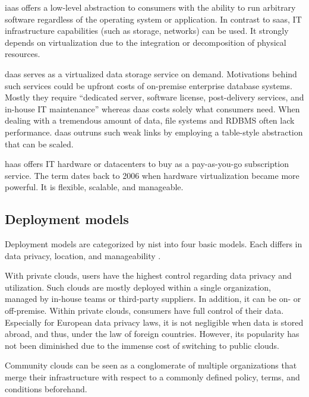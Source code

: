 \ac{iaas} offers a low-level abstraction to consumers with the ability to run arbitrary software regardless of the operating system or application.
In contrast to \ac{saas}, IT infrastructure capabilities (such as storage, networks) can be used.
It strongly depends on virtualization due to the integration or decomposition of physical resources. \cite{Mell2011}

\ac{daas} serves as a virtualized data storage service on demand.
Motivations behind such services could be upfront costs of on-premise enterprise database systems. \cite{Dillon2010}
Mostly they require \enquote{dedicated server, software license, post-delivery services, and in-house IT maintenance} \cite{Dillon2010} whereas \ac{daas} costs solely what consumers need.
When dealing with a tremendous amount of data, file systems and RDBMS often lack performance.
\ac{daas} outruns such weak links by employing a table-style abstraction that can be scaled. \cite{Dillon2010}

\ac{haas} offers IT hardware or datacenters to buy as a pay-as-you-go subscription service.
The term dates back to 2006 when hardware virtualization became more powerful.
It is flexible, scalable, and manageable. \cite{Wang2010}

\subsection{Deployment models}
\label{subsec:cloud-deployment}

Deployment models are categorized by \ac{nist} into four basic models.
Each differs in data privacy, location, and manageability \cite{Mell2011}.

With private clouds, users have the highest control regarding data privacy and utilization.
Such clouds are mostly deployed within a single organization, managed by in-house teams or third-party suppliers.
In addition, it can be on- or off-premise.
Within private clouds, consumers have full control of their data.
Especially for European data privacy laws, it is not negligible when data is stored abroad, and thus, under the law of foreign countries.
However, its popularity has not been diminished due to the immense cost of switching to public clouds. \cite{Dillon2010, Mell2011}

Community clouds can be seen as a conglomerate of multiple organizations that merge their infrastructure with respect to a commonly defined policy, terms, and conditions beforehand. \cite{Mell2011}

